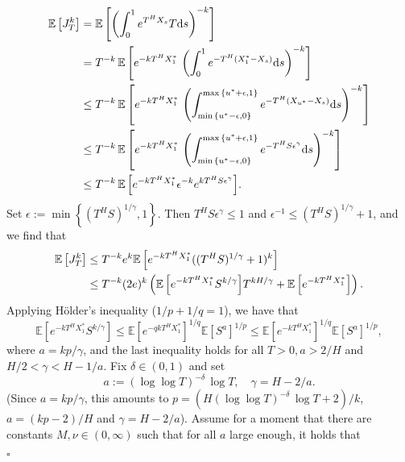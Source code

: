 \documentclass[11pt]{article}
\theoremstyle{plain}
\theoremstyle{definition}
\renewenvironment{proof}[1][] {\smallskip \noindent {\bf Proof#1.} }{\hspace*{\fill}$\square$\medskip\par}
\begin{document}
\begin{proof}[ of Proposition~\ref{prop:moment_disorder_current_functional}]
\begin{align*}
   {\mathbb{E}\left[{J_T^k}\right]} &= {\mathbb{E}\left[{ \left( \int_0^1 e^{T^H X_s} T {{\rm d}} s \right)^{-k} }\right]} \\
&= T^{-k} \, {\mathbb{E}\left[{ e^{-kT^H X_1^*} \, \left( \int_0^1 e^{-T^H (X_1^* - X_s)} {{\rm d}} s \right)^{-k}  }\right]} \\
&\le T^{-k} \, {\mathbb{E}\left[{ e^{-kT^H X_1^*} \, \left( \int_{\min{\left\lbrace {u^* - \epsilon,0} \right\rbrace}}^{\max{\left\lbrace {u^* + \epsilon,1} \right\rbrace}} e^{-T^H (X_{u^*} - X_s)} {{\rm d}} s \right)^{-k}  }\right]} \\
&\le T^{-k} \, {\mathbb{E}\left[{ e^{-kT^H X_1^*} \, \left( \int_{\min{\left\lbrace {u^* - \epsilon,0} \right\rbrace}}^{\max{\left\lbrace {u^* + \epsilon,1} \right\rbrace}} e^{-T^H S \epsilon^\gamma} {{\rm d}} s \right)^{-k}  }\right]} \\
&\le T^{-k} \, {\mathbb{E}\left[{ e^{-kT^H X_1^*} \epsilon^{-k} e^{k T^H S \epsilon^\gamma} }\right]}.
\end{align*}
Set $\epsilon := \min{\left\lbrace {(T^H S)^{1/\gamma},1} \right\rbrace}$. Then $T^H S \epsilon^\gamma \le 1$ and $\epsilon^{-1} \le (T^H S)^{1/\gamma} + 1$, and we find that
\begin{align}
    {\mathbb{E}\left[{J_T^k}\right]} &\le T^{-k} e^k {\mathbb{E}\left[{ e^{-kT^H X_1^*} ( (T^H S)^{1/\gamma} + 1 )^k }\right]} \notag \\
&\le T^{-k} (2e)^k \left( {\mathbb{E}\left[{ e^{-kT^H X_1^*} S^{k/\gamma} }\right]} T^{kH/\gamma}  + {\mathbb{E}\left[{e^{-kT^H X_1^*}}\right]} \right). \label{eq:int_func_prelim}
\end{align}
Applying H\"{o}lder's inequality ($1/p + 1/q = 1$), we have that 
\begin{equation}\label{eq:Hoelder_estimate}
   {\mathbb{E}\left[{ e^{-kT^H X_1^*}  S^{k/\gamma} }\right]} \le {\mathbb{E}\left[{ e^{-q kT^H X_1^*}}\right]}^{1/q}  {\mathbb{E}\left[{S^{a} }\right]}^{1/p} \le {\mathbb{E}\left[{ e^{- kT^H X_1^*}}\right]}^{1/q}  {\mathbb{E}\left[{S^{a} }\right]}^{1/p}, 
\end{equation}
where $a = kp/\gamma$, and the last inequality holds for all $T > 0, a > 2/H$ and $H/2 < \gamma < H - 1/a$. Fix $\delta \in (0,1)$ and set
\[
   a := (\log \log T)^{-\delta} \, \log T ,\quad \gamma = H - 2/a.
\]
(Since $a = kp/\gamma$, this amounts to $p = ( H (\log \log T)^{-\delta} \, \log T + 2) / k$, $a = (kp - 2)/H$ and $\gamma = H - 2/a$).
Assume for a moment that there are constants $M,\nu \in (0,\infty)$ such that for all $a$ large enough, it holds that

\end{proof}
\end{document}
